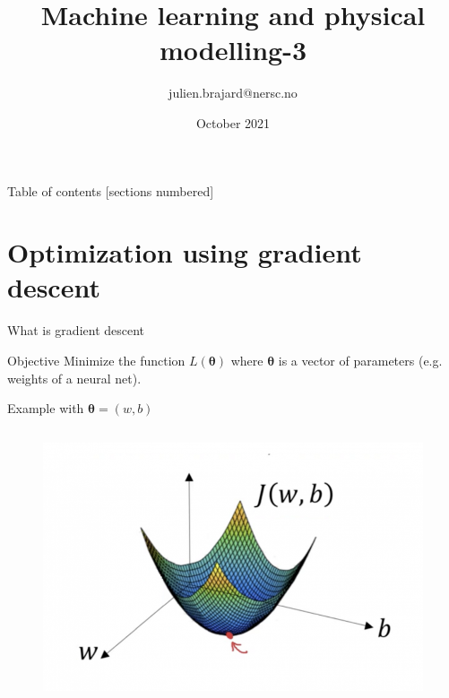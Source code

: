 \documentclass[handout]{beamer}
\title[Machine Learning]{Machine learning and physical modelling-3}
\author[J. Brajard]{julien.brajard@nersc.no}
\institute[NERSC]{NERSC\\
\url{https://github.com/brajard/MAT330}}
\date{October 2021}
\begin{document}
\begin{frame}
\titlepage
\end{frame}


\begin{frame}{Table of contents}
  [sections numbered]
  \tableofcontents[hideallsubsections]
\end{frame}


\section{Optimization using gradient descent}
\begin{frame}{What is gradient descent}
\begin{block}{Objective}
Minimize the function $L(\boldsymbol{\theta})$ where $\boldsymbol{\theta}$ is a vector of parameters (e.g. weights of a neural net).
\end{block}
Example with $\boldsymbol{\theta} = (w, b)$
\begin{columns}

\begin{figure}
    \centering
    \includegraphics[width=.9\textwidth]{fig/L3/gradient-descent-convex-function.png}
\end{figure}


\end{columns}
\end{frame}
\end{document}
